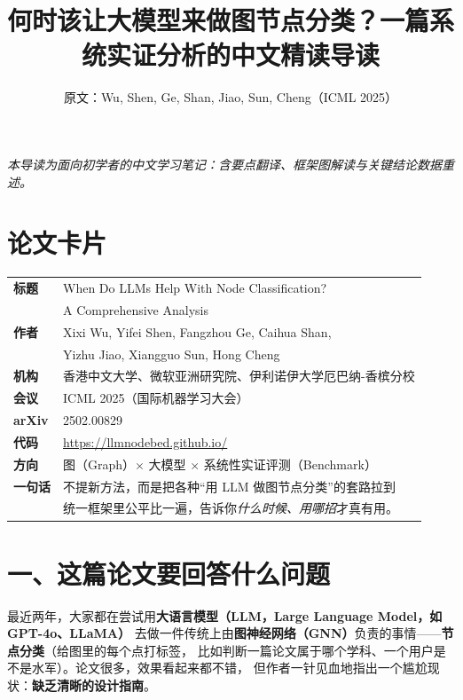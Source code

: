 \documentclass[11pt,UTF8,fontset=fandol]{ctexart}
\title{何时该让大模型来做图节点分类？一篇系统实证分析的中文精读导读}
\author{原文：Wu, Shen, Ge, Shan, Jiao, Sun, Cheng（ICML 2025）}
\date{}
\begin{document}
\maketitle
\begin{center}\small\textit{本导读为面向初学者的中文学习笔记：含要点翻译、框架图解读与关键结论数据重述。}\end{center}

\section*{论文卡片}
\begin{center}
\begin{tabular}{@{}ll@{}}
\toprule
\textbf{标题} & When Do LLMs Help With Node Classification? \\
            & A Comprehensive Analysis \\
\textbf{作者} & Xixi Wu, Yifei Shen, Fangzhou Ge, Caihua Shan, \\
            & Yizhu Jiao, Xiangguo Sun, Hong Cheng \\
\textbf{机构} & 香港中文大学、微软亚洲研究院、伊利诺伊大学厄巴纳-香槟分校 \\
\textbf{会议} & ICML 2025（国际机器学习大会） \\
\textbf{arXiv} & 2502.00829 \\
\textbf{代码} & \url{https://llmnodebed.github.io/} \\
\textbf{方向} & 图（Graph）$\times$ 大模型 $\times$ 系统性实证评测（Benchmark） \\
\textbf{一句话} & 不提新方法，而是把各种“用 LLM 做图节点分类”的套路拉到\\
              & 统一框架里公平比一遍，告诉你\emph{什么时候、用哪招}才真有用。 \\
\bottomrule
\end{tabular}
\end{center}

\section{一、这篇论文要回答什么问题}

最近两年，大家都在尝试用\textbf{大语言模型（LLM，Large Language Model，如 GPT-4o、LLaMA）}
去做一件传统上由\textbf{图神经网络（GNN）}负责的事情——\textbf{节点分类}（给图里的每个点打标签，
比如判断一篇论文属于哪个学科、一个用户是不是水军）。论文很多，效果看起来都不错，
但作者一针见血地指出一个尴尬现状：\textbf{缺乏清晰的设计指南}。
\end{document}
